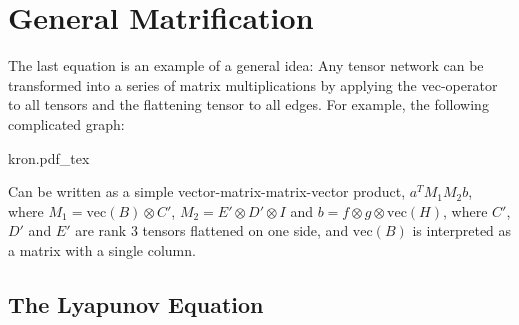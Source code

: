 
\section{General Matrification}

The last equation is an example of a general idea:
Any tensor network can be transformed into a series of matrix multiplications by applying the vec-operator to all tensors and the flattening tensor to all edges.
For example, the following complicated graph:
\begin{center}
   \def\svgwidth{.7\linewidth}
   {kron.pdf_tex}
\end{center}
Can be written as a simple vector-matrix-matrix-vector product, $a^T M_1 M_2 b$,
where $M_1 = \mathrm{vec}(B) \otimes C'$,
$M_2 = E' \otimes D' \otimes I$ and $b = f\otimes g\otimes \mathrm{vec}(H)$,
where $C'$, $D'$ and $E'$ are rank 3 tensors flattened on one side, and $\mathrm{vec}(B)$ is interpreted as a matrix with a single column.


\subsection{The Lyapunov Equation}

